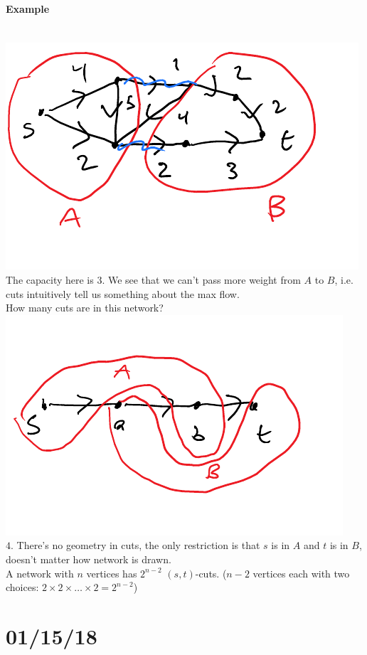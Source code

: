 \documentclass[12 pt]{article}
\begin{document}
        \paragraph{Example}
        ~\\\includegraphics[width=.7\textwidth]{i20.pdf}
        \\ The capacity here is $3$. We see that we can't pass more
        weight from $A$ to $B$, i.e. cuts intuitively tell us
        something about the max flow.
        \\ How many cuts are in this network?
        \\ \includegraphics[width=.7\textwidth]{i21.pdf}
        \\ $4$. There's no geometry in cuts, the only restriction is
        that $s$ is in $A$ and $t$ is in $B$, doesn't matter how
        network is drawn.
        \\ A network with $n$ vertices has $2^{n-2}$
        $(s,t)$-cuts. ($n-2$ vertices each with two choices: $2\times
        2 \times \ldots \times 2=2^{n-2}$)
    \section{01/15/18}
\end{document}
